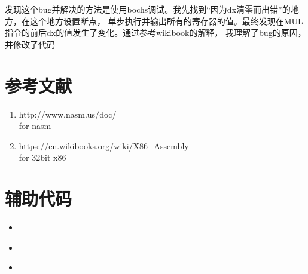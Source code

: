 \documentclass[a4paper]{article}
\newcommand{\shfilescript}[3]{
\begin{itemize}
\item[]
\end{itemize}
}
\begin{document}
发现这个bug并解决的方法是使用bochs调试。我先找到``因为dx清零而出错”的地方，在这个地方设置断点，
单步执行并输出所有的寄存器的值。最终发现在MUL指令的前后dx的值发生了变化。通过参考wikibook的解释，
我理解了bug的原因，并修改了代码
\begin{appendices}
\section{参考文献}
\label{reference}
\begin{enumerate}
    \item http://www.nasm.us/doc/ \\
    for nasm
    \item https://en.wikibooks.org/wiki/X86\_Assembly \\
    for 32bit x86
  \end{enumerate}
    \section{辅助代码}\label{utilitycode}
    \shfilescript{buildFile}{build.sh文件内容}{../build.sh}
    \shfilescript{runFile}{run.sh文件内容}{../run.sh}
    \begin{itemize}
        \item[]
    \end{itemize}
\end{appendices}
\end{document}
